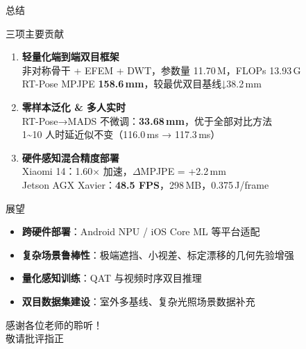 \documentclass{beamer}
\begin{document}
\begin{frame}{总结}
    \begin{block}{三项主要贡献}
        \small
        \begin{enumerate}
            \item \textbf{轻量化端到端双目框架}\\
                非对称骨干 + EFEM + DWT，参数量 11.70\,M，FLOPs 13.93\,G\\
                RT-Pose MPJPE \textbf{158.6\,mm}，较最优双目基线↓38.2\,mm
            \vspace{2pt}
            \item \textbf{零样本泛化 \& 多人实时}\\
                RT-Pose→MADS 不微调：\textbf{33.68\,mm}，优于全部对比方法\\
                1\textasciitilde10 人时延近似不变（116.0\,ms → 117.3\,ms）
            \vspace{2pt}
            \item \textbf{硬件感知混合精度部署}\\
                Xiaomi 14：1.60$\times$ 加速，$\Delta$MPJPE = +2.2\,mm\\
                Jetson AGX Xavier：\textbf{48.5 FPS}，298\,MB，0.375\,J/frame
        \end{enumerate}
    \end{block}
\end{frame}

\begin{frame}{展望}
    \begin{itemize}
        \item \textbf{跨硬件部署}：Android NPU / iOS Core ML 等平台适配
        \vspace{6pt}
        \item \textbf{复杂场景鲁棒性}：极端遮挡、小视差、标定漂移的几何先验增强
        \vspace{6pt}
        \item \textbf{量化感知训练}：QAT 与视频时序双目推理
        \vspace{6pt}
        \item \textbf{双目数据集建设}：室外多基线、复杂光照场景数据补充
    \end{itemize}
\end{frame}

\begin{frame}
    \begin{center}
        {\Huge\calligra 感谢各位老师的聆听！}\\[1.5em]
        {\large 敬请批评指正}
    \end{center}
\end{frame}
\end{document}
